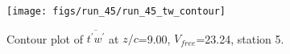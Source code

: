 \begin{figure}[H]
\centering
\texttt{[image: figs/run\_45/run\_45\_tw\_contour]}
\caption{Contour plot of $\overline{t^\prime w^\prime}$ at $z/c$=9.00, $V_{free}$=23.24, station 5.}
\label{fig:run_45_tw_contour}
\end{figure}


